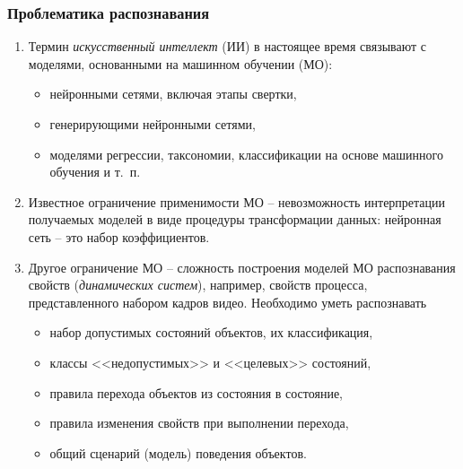 \documentclass[handout]{beamer}
\begin{document}
\begin{frame}
  \frametitle{Проблематика распознавания}
  \begin{enumerate}
  \item Термин \emph{искусственный интеллект} (ИИ) в настоящее время связывают с моделями, основанными на машинном обучении (МО):
    \begin{itemize}
    \item нейронными сетями, включая этапы свертки,
    \item генерирующими нейронными сетями,
    \item моделями регрессии, таксономии, классификации на основе машинного обучения и т.~п.
    \end{itemize}
  \item Известное ограничение применимости МО -- невозможность интерпретации получаемых моделей в виде процедуры трансформации данных: нейронная сеть -- это набор коэффициентов.
  \item Другое ограничение МО -- сложность построения моделей МО распознавания свойств (\emph{динамических систем}), например, свойств процесса, представленного набором кадров видео. Необходимо уметь распознавать
    \begin{itemize}
    \item набор допустимых состояний объектов, их классификация,
    \item классы <<недопустимых>> и <<целевых>> состояний,
    \item правила перехода объектов из состояния в состояние,
    \item правила изменения свойств при выполнении перехода,
    \item общий сценарий (модель) поведения объектов.
    \end{itemize}
  \end{enumerate}
\end{frame}
\end{document}
